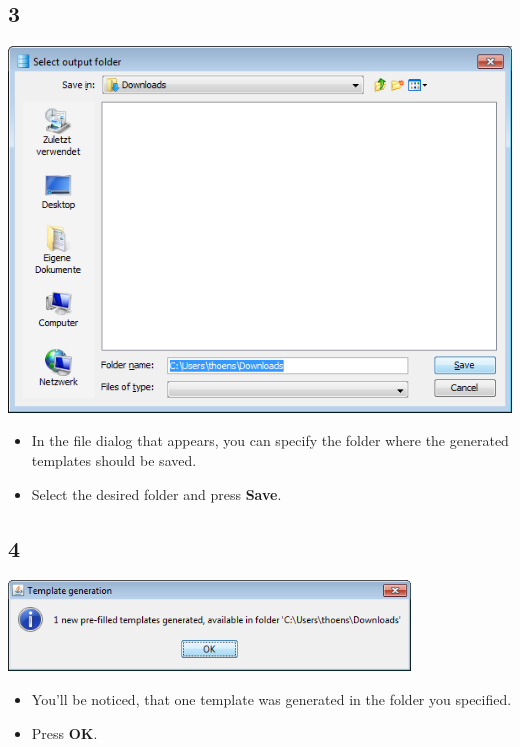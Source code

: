 \documentclass{beamer}
\begin{document}
\subsection{3}
\begin{frame}
	\begin{center}
  		\includegraphics[height=0.5\textheight]{3.png}
	\end{center}
	\begin{itemize}
		\item In the file dialog that appears, you can specify the folder where the generated templates should be saved.
		\item Select the desired folder and press \textbf{Save}.
	\end{itemize}
\end{frame}

\subsection{4}
\begin{frame}
	\begin{center}
  		\includegraphics[width=0.8\textwidth]{4.png}
	\end{center}
	\begin{itemize}
		\item You'll be noticed, that one template was generated in the folder you specified.
		\item Press \textbf{OK}.
	\end{itemize}
\end{frame}
\end{document}
